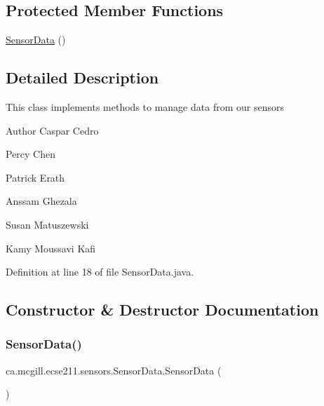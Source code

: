 \subsection*{Protected Member Functions}
\begin{DoxyCompactItemize}
\item 
\hyperlink{classca_1_1mcgill_1_1ecse211_1_1sensors_1_1_sensor_data_a41b9929f62455a15364385a339b4b910}{Sensor\+Data} ()
\end{DoxyCompactItemize}


\subsection{Detailed Description}
This class implements methods to manage data from our sensors

\begin{DoxyAuthor}{Author}
Caspar Cedro 

Percy Chen 

Patrick Erath 

Anssam Ghezala 

Susan Matuszewski 

Kamy Moussavi Kafi 
\end{DoxyAuthor}


Definition at line 18 of file Sensor\+Data.\+java.



\subsection{Constructor \& Destructor Documentation}
\mbox{\label{classca_1_1mcgill_1_1ecse211_1_1sensors_1_1_sensor_data_a41b9929f62455a15364385a339b4b910}} 
\subsubsection{\texorpdfstring{Sensor\+Data()}{SensorData()}}
{\footnotesize\ttfamily ca.\+mcgill.\+ecse211.\+sensors.\+Sensor\+Data.\+Sensor\+Data (\begin{DoxyParamCaption}{ }\end{DoxyParamCaption})\hspace{0.3cm}{\ttfamily [protected]}}

